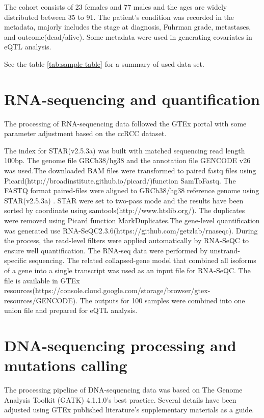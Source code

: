 The cohort consists of 23 females and 77 males and the ages are widely distributed between 35 to 91. The patient's condition was recorded in the metadata, majorly includes the stage at diagnosis, Fuhrman grade, metastases, and outcome(dead/alive). Some metadata were used in generating covariates in eQTL analysis.

See the table \ref{tab:sample-table} for a summary of used data set.



\section{RNA-sequencing and quantification}

The processing of RNA-sequencing data followed the GTEx portal with some parameter adjustment based on the ccRCC dataset.

The index for STAR(v2.5.3a)\cite{dobin_star_2013} was built with matched sequencing read length 100bp. The genome file GRCh38/hg38 and the annotation file GENCODE v26 was used.The downloaded BAM files were transformed to paired fastq files using Picard(http://broadinstitute.github.io/picard/)function SamToFastq. The FASTQ format paired-files were aligned to GRCh38/hg38 reference genome using STAR(v2.5.3a) \cite{dobin_star_2013}. STAR were set to two-pass mode and the results have been sorted by coordinate using samtools(http://www.htslib.org/). The duplicates were removed using Picard function MarkDuplicates.The gene-level quantification was generated use RNA-SeQC2.3.6(https://github.com/getzlab/rnaseqc). During the process, the read-level filters were applied automatically by RNA-SeQC to ensure well quantification. The RNA-seq data were performed by unstrand-specific sequencing. The related collapsed-gene model that combined all isoforms of a gene into a single transcript was used as an input file for RNA-SeQC. The file is available in GTEx resources(https://console.cloud.google.com/storage/browser/gtex-resources/GENCODE). The outputs for 100 samples were combined into one union file and prepared for eQTL analysis.


\section{DNA-sequencing processing and mutations calling}

The processing pipeline of DNA-sequencing data was based on The Genome Analysis Toolkit (GATK) 4.1.1.0\cite{mckenna_genome_2010}'s best practice. Several details have been adjusted using GTEx published literature\cite{noauthor_gtex_2020}'s supplementary materials as a guide.


